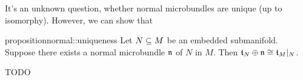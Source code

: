 \begin{myparagraph}
    It's an unknown question,
    whether normal microbundles are unique (up to isomorphy).
    However, we can show that 
\end{myparagraph}

\begin{mystatement}{proposition}{normal::uniqueness}
    Let $N \subseteq{} M$ be an embedded submanifold.
    Suppose there exists a normal microbundle $\mathfrak{n}$ of $N$ in $M$.
    Then $\mathfrak{t}_N \oplus \mathfrak{n} \cong \mathfrak{t}_M\vert_{N}$.
\end{mystatement}

\begin{myproof}
    TODO
\end{myproof}